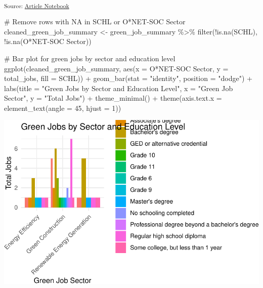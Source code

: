 \documentclass[
  letterpaper,
  DIV=11,
  numbers=noendperiod]{scrartcl}
\newenvironment{Shaded}{\begin{snugshade}}{\end{snugshade}}
\newcommand{\AttributeTok}[1]{\textcolor[rgb]{0.40,0.45,0.13}{#1}}
\newcommand{\CommentTok}[1]{\textcolor[rgb]{0.37,0.37,0.37}{#1}}
\newcommand{\DecValTok}[1]{\textcolor[rgb]{0.68,0.00,0.00}{#1}}
\newcommand{\FunctionTok}[1]{\textcolor[rgb]{0.28,0.35,0.67}{#1}}
\newcommand{\NormalTok}[1]{\textcolor[rgb]{0.00,0.23,0.31}{#1}}
\newcommand{\OtherTok}[1]{\textcolor[rgb]{0.00,0.23,0.31}{#1}}
\newcommand{\SpecialCharTok}[1]{\textcolor[rgb]{0.37,0.37,0.37}{#1}}
\newcommand{\StringTok}[1]{\textcolor[rgb]{0.13,0.47,0.30}{#1}}
\begin{document}
\textsubscript{Source:
\href{https://beeckcenter.github.io/climate-equity-workforce/index-preview.html}{Article
Notebook}}

\begin{Shaded}
\begin{Highlighting}[]
\CommentTok{\# Remove rows with NA in \textquotesingle{}SCHL\textquotesingle{} or \textquotesingle{}O*NET{-}SOC Sector\textquotesingle{}}
\NormalTok{cleaned\_green\_job\_summary }\OtherTok{\textless{}{-}}\NormalTok{ green\_job\_summary }\SpecialCharTok{\%\textgreater{}\%}
  \FunctionTok{filter}\NormalTok{(}\SpecialCharTok{!}\FunctionTok{is.na}\NormalTok{(SCHL), }\SpecialCharTok{!}\FunctionTok{is.na}\NormalTok{(}\StringTok{\textasciigrave{}}\AttributeTok{O*NET{-}SOC Sector}\StringTok{\textasciigrave{}}\NormalTok{))}

\CommentTok{\# Bar plot for green jobs by sector and education level}
\FunctionTok{ggplot}\NormalTok{(cleaned\_green\_job\_summary, }\FunctionTok{aes}\NormalTok{(}\AttributeTok{x =} \StringTok{\textasciigrave{}}\AttributeTok{O*NET{-}SOC Sector}\StringTok{\textasciigrave{}}\NormalTok{, }\AttributeTok{y =}\NormalTok{ total\_jobs, }\AttributeTok{fill =}\NormalTok{ SCHL)) }\SpecialCharTok{+}
  \FunctionTok{geom\_bar}\NormalTok{(}\AttributeTok{stat =} \StringTok{"identity"}\NormalTok{, }\AttributeTok{position =} \StringTok{"dodge"}\NormalTok{) }\SpecialCharTok{+}
  \FunctionTok{labs}\NormalTok{(}\AttributeTok{title =} \StringTok{"Green Jobs by Sector and Education Level"}\NormalTok{,}
       \AttributeTok{x =} \StringTok{"Green Job Sector"}\NormalTok{, }\AttributeTok{y =} \StringTok{"Total Jobs"}\NormalTok{) }\SpecialCharTok{+}
  \FunctionTok{theme\_minimal}\NormalTok{() }\SpecialCharTok{+}
  \FunctionTok{theme}\NormalTok{(}\AttributeTok{axis.text.x =} \FunctionTok{element\_text}\NormalTok{(}\AttributeTok{angle =} \DecValTok{45}\NormalTok{, }\AttributeTok{hjust =} \DecValTok{1}\NormalTok{))}
\end{Highlighting}
\end{Shaded}

\includegraphics{index_files/figure-pdf/unnamed-chunk-45-1.pdf}
\end{document}
